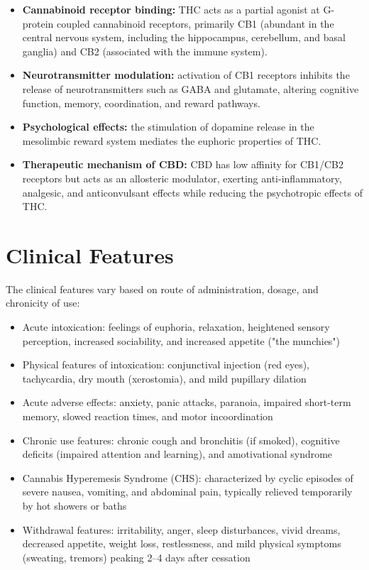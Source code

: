 \begin{itemize}
    \item \textbf{Cannabinoid receptor binding:} THC acts as a partial agonist at G-protein coupled cannabinoid receptors, primarily CB1 (abundant in the central nervous system, including the hippocampus, cerebellum, and basal ganglia) and CB2 (associated with the immune system).
    \item \textbf{Neurotransmitter modulation:} activation of CB1 receptors inhibits the release of neurotransmitters such as GABA and glutamate, altering cognitive function, memory, coordination, and reward pathways.
    \item \textbf{Psychological effects:} the stimulation of dopamine release in the mesolimbic reward system mediates the euphoric properties of THC.
    \item \textbf{Therapeutic mechanism of CBD:} CBD has low affinity for CB1/CB2 receptors but acts as an allosteric modulator, exerting anti-inflammatory, analgesic, and anticonvulsant effects while reducing the psychotropic effects of THC.
\end{itemize}

\section*{Clinical Features}
The clinical features vary based on route of administration, dosage, and chronicity of use:

\begin{itemize}
    \item Acute intoxication: feelings of euphoria, relaxation, heightened sensory perception, increased sociability, and increased appetite ("the munchies")
    \item Physical features of intoxication: conjunctival injection (red eyes), tachycardia, dry mouth (xerostomia), and mild pupillary dilation
    \item Acute adverse effects: anxiety, panic attacks, paranoia, impaired short-term memory, slowed reaction times, and motor incoordination
    \item Chronic use features: chronic cough and bronchitis (if smoked), cognitive deficits (impaired attention and learning), and amotivational syndrome
    \item Cannabis Hyperemesis Syndrome (CHS): characterized by cyclic episodes of severe nausea, vomiting, and abdominal pain, typically relieved temporarily by hot showers or baths
    \item Withdrawal features: irritability, anger, sleep disturbances, vivid dreams, decreased appetite, weight loss, restlessness, and mild physical symptoms (sweating, tremors) peaking 2--4 days after cessation
\end{itemize}

